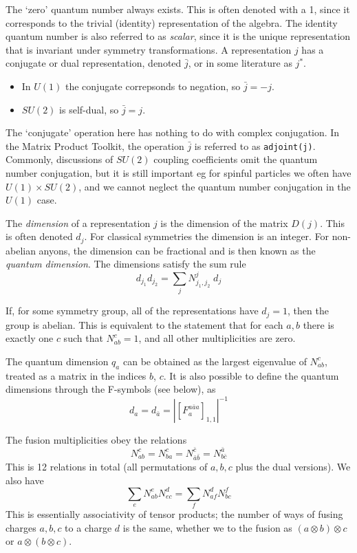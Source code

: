 \documentclass[12pt]{article}
\begin{document}
The `zero' quantum number always exists. This is often denoted with a 1, since it corresponds
to the trivial (identity) representation of the algebra. 
The identity quantum number is also referred to as \emph{scalar}, since it is
the unique representation that is invariant under symmetry transformations.
A representation $j$ has a conjugate or dual representation, denoted $\bar{j}$,
or in some literature as $j^*$.
\begin{itemize}
\item In $U(1)$ the conjugate correpsonds to negation, so $\bar{j} = -j$.
\item $SU(2)$ is self-dual, so $\bar{j} = j$.
\end{itemize}
The `conjugate' operation here has nothing to do with complex conjugation.  In the Matrix
Product Toolkit, the operation $\bar{j}$ is referred to as \texttt{adjoint(j)}.
Commonly, discussions of $SU(2)$ coupling coefficients omit the quantum number conjugation,
but it is still important eg for spinful particles we often have $U(1)\times SU(2)$, and
we cannot neglect the quantum number conjugation in the $U(1)$ case.

The \emph{dimension} of a representation $j$ is the dimension of the matrix $D(j)$. This
is often denoted $d_j$. For classical symmetries the dimension is an integer. For non-abelian
anyons, the dimension can be fractional and is then known as the \emph{quantum dimension}.
The dimensions satisfy the sum rule
\begin{equation}
d_{j_1} d_{j_2} = \sum_j N^{j}_{j_1,j_2} \; d_j
\end{equation}

If, for some symmetry group, all of the representations have $d_j = 1$, then the
group is abelian. This is equivalent to the statement that for each $a,b$ there is exactly
one $c$ such that $N^{c}_{ab} = 1$, and all other multiplicities are zero.

The quantum dimension $q_a$ can be obtained as the largest eigenvalue of $N^c_{ab}$, treated
as a matrix in the indices $b$, $c$. It is also possible to define the quantum dimensions through
the F-symbols (see below), as
\begin{equation}
d_a = d_{\bar{a}} = \left| [F^{a\bar{a}a}_a]_{1,1} \right|^{-1}
\end{equation}

The fusion multiplicities obey the relations
\begin{equation}
N^{c}_{ab} = N^{c}_{ba} = N^{\bar{c}}_{\bar{a}\bar{b}} = N^{\bar{a}}_{b \bar{c}}
\end{equation}
This is 12 relations in total (all permutations of $a,b,c$ plus the dual versions).
We also have
\begin{equation}
\sum_e N^{e}_{ab} N^d_{ec} = \sum_f N^d_{af} N^f_{bc}
\end{equation}
This is essentially associativity of tensor products; the number of ways of fusing
charges $a,b,c$ to a charge $d$ is the same, whether we to the fusion as
$(a\otimes b) \otimes c$ or $a \otimes (b \otimes c)$.
\end{document}
